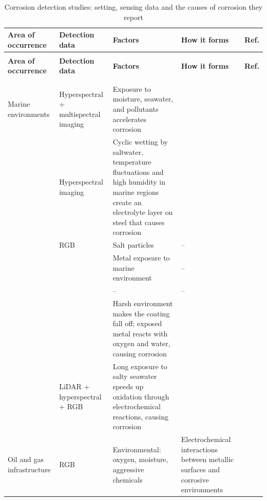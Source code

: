{\scriptsize
\renewcommand{\arraystretch}{1.15}
\setlength{\tabcolsep}{3pt}
\begin{xltabular}{\textwidth}{>{\RaggedRight\arraybackslash}p{2.3cm}>{\RaggedRight\arraybackslash}p{3.0cm}>{\RaggedRight\arraybackslash}X>{\RaggedRight\arraybackslash}p{3.2cm}>{\RaggedRight\arraybackslash}p{1.0cm}}
\caption{Corrosion detection studies: setting, sensing data and the causes of corrosion they report}\label{tab:corrosion-detection}\\
\toprule
\textbf{Area of occurrence} & \textbf{Detection data} & \textbf{Factors} & \textbf{How it forms} & \textbf{Ref.} \\
\midrule
\endfirsthead
{}\\
\toprule
\textbf{Area of occurrence} & \textbf{Detection data} & \textbf{Factors} & \textbf{How it forms} & \textbf{Ref.} \\
\midrule
\endhead
\midrule{}\\
\endfoot
\bottomrule
{}\\
\endlastfoot
Marine environments & Hyperspectral + multispectral imaging & Exposure to moisture, seawater, and pollutants accelerates corrosion &  & \citep{Hernndez-Surez2026} \\
 & Hyperspectral imaging & Cyclic wetting by saltwater, temperature fluctuations and high humidity in marine regions create an electrolyte layer on steel that causes corrosion &  & \citep{Arias2025} \\
 & RGB & Salt particles & -- & \citep{Fu2024} \\
 &  & Metal exposure to marine environment & -- & \citep{Imran2025} \\
 &  & -- & -- & \citep{Yao2019} \\
 &  & Harsh environment makes the coating fall off; exposed metal reacts with oxygen and water, causing corrosion &  & \citep{Hu2023} \\
 & LiDAR + hyperspectral + RGB & Long exposure to salty seawater speeds up oxidation through electrochemical reactions, causing corrosion &  & \citep{PallasEnguita2025} \\
\midrule
Oil and gas infrastructure & RGB & Environmental: oxygen, moisture, aggressive chemicals & Electrochemical interactions between metallic surfaces and corrosive  environments & \citep{Alvani2026} \\

\end{xltabular}}
